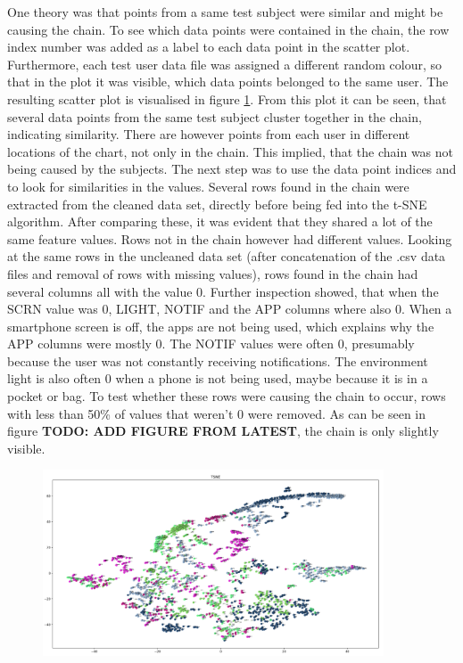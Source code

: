 One theory was that points from a same test subject were similar and might be causing the chain. To see which data points were contained in the chain, the row index number was added as a label to each data point in the scatter plot. Furthermore, each test user data file was assigned a different random colour, so that in the plot it was visible, which data points belonged to the same user. The resulting scatter plot is visualised in figure \ref{figure:tsneTestSubjectsColor}. From this plot it can be seen, that several data points from the same test subject cluster together in the chain, indicating similarity. There are however points from each user in different locations of the chart, not only in the chain. This implied, that the chain was not being caused by the subjects. The next step was to use the data point indices and to look for similarities in the values. Several rows found in the chain were extracted from the cleaned data set, directly before being fed into the t-SNE algorithm. After comparing these, it was evident that they shared a lot of the same feature values. Rows not in the chain however had different values. Looking at the same rows in the uncleaned data set (after concatenation of the .csv data files and removal of rows with missing values), rows found in the chain had several columns all with the value 0.  Further inspection showed, that when the SCRN value was 0, LIGHT, NOTIF and the APP columns where also 0. When a smartphone screen is off, the apps are not being used, which explains why the APP columns were mostly 0. The NOTIF values were often 0, presumably because the user was not constantly receiving notifications. The environment light is also often 0 when a phone is not being used, maybe because it is in a pocket or bag. To test whether these rows were causing the chain to occur, rows with less than 50\% of values that weren't 0 were removed. As can be seen in figure \textbf{TODO: ADD FIGURE FROM LATEST}, the chain is only slightly visible.




\begin{figure}[h]
  \centering
  \includegraphics[width=0.9\textwidth]{./images/tsneTestSubjectsColor.png}
  \caption{}
  \label{figure:tsneTestSubjectsColor}
\end{figure}

